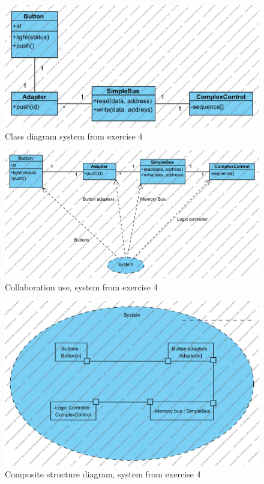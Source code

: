 \documentclass{article}
\begin{document}
\begin{figure}[htbp]
  \centering
  \includegraphics[width=0.8\linewidth]{../class3}
  \caption{Class diagram system from exercise 4}
  \label{fig:classex4}
\end{figure}
\begin{figure}[htbp]
  \centering
  \includegraphics[width=\linewidth]{../class4}
  \caption{Collaboration use, system from exercise 4}
  \label{fig:collabex4}
\end{figure}

\begin{figure}[htbp]
  \centering
  \includegraphics[width=\linewidth]{../comp2}
  \caption{Composite structure diagram, system from exercise 4}
  \label{fig:compex4}
\end{figure}
  
\end{document}
